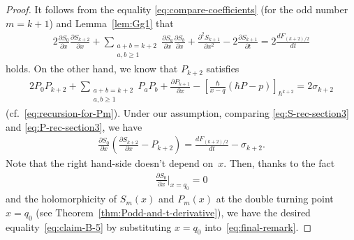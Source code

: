 \documentclass[11pt]{article}
\theoremstyle{definition}
\numberwithin{equation}{section}
\def\p{\partial}
\begin{document}
\begin{proof}
It follows from
the equality \eqref{eq:compare-coefficients}
(for the odd number $m = k+1$) and Lemma~\ref{lem:Gg1} that
\begin{gather} \label{eq:S-rec-section3}
2 \frac{\p S_{0}}{\p x}\frac{\p S_{k+2}}{\p x} +
\sum_{\substack{a+b=k+2 \\ a, b \ge 1}}
\frac{\p S_{a}}{\p x}\frac{\p S_{b}}{\p x} +
\frac{\p^{2} S_{k+1}}{\p x^{2}}
- 2\frac{\p S_{k+1}}{\p t}
 = 2 \frac{d F_{(k+2)/2}}{dt}
\end{gather}
holds.
On the other hand, we know that $P_{k+2}$ satisf\/ies
\begin{gather} \label{eq:P-rec-section3}
2 P_{0}P_{k+2} +
\sum_{\substack{a+b=k+2 \\ a, b \ge 1}}
P_{a}P_{b} +
\frac{\p P_{k+1}}{\p x} - \left[ \frac{\hbar}{x-q}
\left( \hbar P-p \right) \right]_{\hbar^{k+2}}
 = 2 \sigma_{k+2}
\end{gather}
(cf.~\eqref{eq:recursion-for-Pm}).
Under our assumption, comparing \eqref{eq:S-rec-section3}
and \eqref{eq:P-rec-section3}, we have
\begin{gather} \label{eq:final-remark}
\frac{\p S_{0}}{\p x} \left( \frac{\p S_{k+2}}{\p x} - P_{k+2} \right)
 = \frac{d F_{(k+2)/2}}{dt} - \sigma_{k+2}.
\end{gather}
Note that the right hand-side doesn't depend on~$x$.
Then, thanks to the fact
\begin{gather*}
\frac{\p S_{0}}{\p x} \biggr|_{x=q_{0}}
= 0
\end{gather*}
and the holomorphicity of $S_{m}(x)$ and $P_{m}(x)$
at the double turning point $x = q_0$
(see Theorem~\ref{thm:Podd-and-t-derivative}),
we have the desired equality~\eqref{eq:claim-B-5}
by substituting $x = q_{0}$ into~\eqref{eq:final-remark}.
\end{proof}
\end{document}

